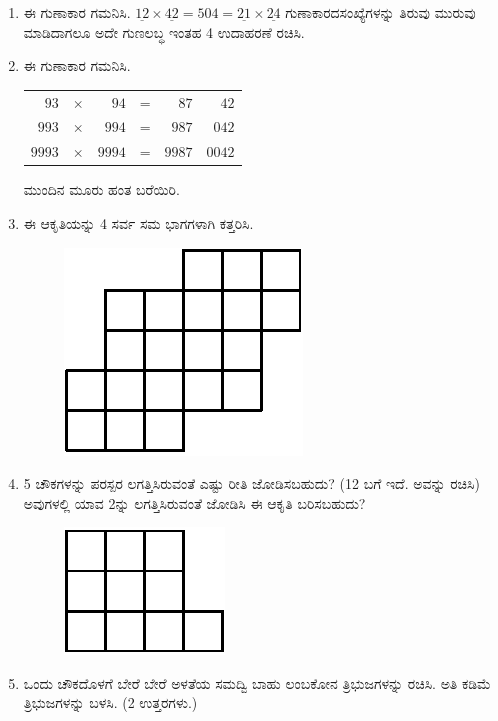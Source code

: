 \begin{enumerate}
\item ಈ ಗುಣಾಕಾರ ಗಮನಿಸಿ. $\underline{12}\times \underline{42} = 504 = \underline{21}\times \underline{24}$ ಗುಣಾಕಾರದ\break ಸಂಖ್ಯೆಗಳನ್ನು ತಿರುವು ಮುರುವು ಮಾಡಿದಾಗಲೂ ಅದೇ ಗುಣಲಬ್ಧ ಇಂತಹ 4 ಉದಾಹರಣೆ ರಚಿಸಿ. 

\item ಈ ಗುಣಾಕಾರ ಗಮನಿಸಿ. 

\begin{tabular}[t]{r@{\;}c@{\;}r@{\;}c@{\;}rr}
$93$ & $\times$ & $94$ & = & $87$ & $42$\\
$993$ & $\times$ & $994$ & = & $987$ & $042$\\
$9993$ & $\times$ & $9994$ & = & $9987$ & $0042$\\
\end{tabular}

\vskip 0.2cm

ಮುಂದಿನ ಮೂರು ಹಂತ ಬರೆಯಿರಿ. 

\item ಈ ಆಕೃತಿಯನ್ನು 4 ಸರ್ವ ಸಮ ಭಾಗಗಳಾಗಿ ಕತ್ತರಿಸಿ. 
\begin{figure}[H]
\centering
\includegraphics[scale=1.3]{images/chap11/q14.eps}
\end{figure}

\item 5 ಚೌಕಗಳನ್ನು ಪರಸ್ಪರ ಲಗತ್ತಿಸಿರುವಂತೆ ಎಷ್ಟು ರೀತಿ ಜೋಡಿಸಬಹುದು? (12 ಬಗೆ ಇದೆ. ಅವನ್ನು ರಚಿಸಿ) ಅವುಗಳಲ್ಲಿ ಯಾವ 2ನ್ನು ಲಗತ್ತಿಸಿರುವಂತೆ ಜೋಡಿಸಿ ಈ ಆಕೃತಿ ಬರಿಸಬಹುದು? 
\begin{figure}[H]
\centering
\includegraphics[scale=1.4]{images/chap11/q15.eps}
\end{figure}

\item ಒಂದು ಚೌಕದೊಳಗೆ ಬೇರೆ ಬೇರೆ ಅಳತೆಯ ಸಮದ್ವಿ ಬಾಹು ಲಂಬಕೋನ ತ್ರಿಭುಜಗಳನ್ನು ರಚಿಸಿ. ಅತಿ ಕಡಿಮೆ ತ್ರಿಭುಜಗಳನ್ನು ಬಳಸಿ. (2 ಉತ್ತರಗಳು.)


\end{enumerate}
